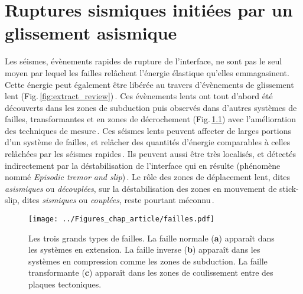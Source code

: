 \chapter[Ruptures sismiques -- Glissement asismique]{Ruptures sismiques initiées par un glissement asismique}
\label{sec:chaparticle}
\vspace*{-0.5cm}



Les séismes, évènements rapides de rupture de l'interface, ne sont pas le seul moyen par lequel les failles relâchent l'énergie élastique qu'elles emmagasinent. Cette énergie peut également être libérée au travers d'évènements de glissement lent (Fig.\,\ref{fig:extract_review})\,\cite{peng_integrated_2010,burgmann_geophysics_2018}. Ces évènements lents ont tout d'abord été découverts dans les zones de subduction puis observés dans d'autres systèmes de failles, transformantes et en zones de décrochement (Fig.\,\ref{fig:typesdefailles}) avec l'amélioration des techniques de mesure\,\cite{harris_large_2017}. Ces séismes lents peuvent affecter de larges portions d'un système de failles, et relâcher des quantités d'énergie comparables à celles relâchées par les séismes rapides\,\cite{dragert_silent_2001}. Ils peuvent aussi être très localisés, et détectés indirectement par la déstabilisation de l'interface qui en résulte (phénomène nommé \textit{Episodic tremor and slip})\,\cite{chen_scaling_2009,shelly_non-volcanic_2007,tan_connecting_2020,rogers_episodic_2003}. Le rôle des zones de déplacement lent, dites \textit{asismiques} ou \textit{découplées}, sur la déstabilisation des zones en mouvement de stick-slip, dites \textit{sismiques} ou \textit{couplées}, reste pourtant méconnu\,\cite{radiguet_triggering_2016,dragert_silent_2001}.


\begin{figure}[h!]
\centering
\texttt{[image: ../Figures\_chap\_article/failles.pdf]}
\caption[Types de failles]{Les trois grands types de failles. La faille normale (\textbf{a}) apparaît dans les systèmes en extension. La faille inverse (\textbf{b}) apparaît dans les systèmes en compression comme les zones de subduction. La faille transformante (\textbf{c}) apparaît dans les zones de coulissement entre des plaques tectoniques.}
\label{fig:typesdefailles}
\end{figure}


